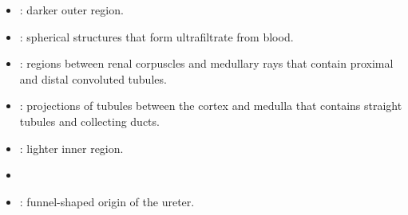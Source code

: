 \begin{multicols}{2}
\begin{itemize}
  \item {}: darker outer region. 
  
  \begin{center}
  \end{center}
  
  \item {}: spherical structures that form ultrafiltrate from blood.
  
  \begin{center}
  \end{center}
  
  \item {}:  regions between renal corpuscles and medullary rays that contain proximal and distal convoluted tubules.
  
  \begin{center}
  \end{center}
  
  \item {}: projections of tubules between the cortex and medulla that contains straight tubules and collecting ducts.
  
  \begin{center}
  \end{center}
  
  \item {}: lighter inner region. 
  
  \begin{center}
  \end{center}
  
  \item {}
  
  \begin{center}
  \end{center}
  
  \item {}: funnel-shaped origin of the ureter.
  
  \begin{center}
  \end{center}
  

\end{itemize}
\end{multicols}
